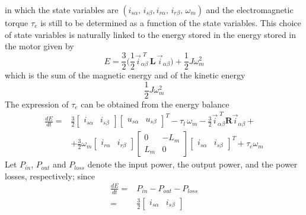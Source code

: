 \documentclass[11pt,a4paper]{scrartcl}
\numberwithin{equation}{section}
\theoremstyle{it}
\theoremstyle{definition}
\begin{document}
\begin{onehalfspace}
in which the state variables are $(i_{s\alpha},\,i_{s\beta}, 
i_{r\alpha},\,i_{r\beta},\,\omega_m)$ and the electromagnetic torque $\tau_e$ 
is still to be determined as a function of the state variables. This choice of 
state variables is naturally linked to the energy stored in the energy stored 
in the motor given by
\begin{equation}\label{im_eq_25}
	E = \frac{3}{2}\Bigg(\frac{1}{2} \vec{i}_{\alpha\beta}^{\,\,T} 
	\,\mathbf{L}\, \vec{i}_{\alpha\beta} \Bigg)+\frac{1}{2}J\omega_m^2
\end{equation}
which is the sum of the magnetic energy and of the kinetic energy
\begin{equation}\label{im_eq_26}
	\frac{1}{2}J\omega_m^2
\end{equation}
The expression of $\tau_e$ can be obtained from the energy balance
\begin{equation}\label{im_eq_27}
	\begin{aligned}
		\frac{dE}{dt} = &
		\frac{3}{2}\left[\begin{matrix}
			i_{s\alpha} & i_{s\beta}
		\end{matrix}\right]
		\left[\begin{matrix}
			u_{s\alpha} & u_{s\beta}
		\end{matrix}\right]^T 
		-\tau_l\,\omega_m-\frac{3}{2}\vec{i}_{\alpha\beta}^{\,\,T}\mathbf{R}\vec{i}_{\alpha\beta}
		+ \\[6pt]
		& + \frac{3}{2}\omega_m
		\left[\begin{matrix}
			i_{r\alpha} & i_{r\beta}
		\end{matrix}\right]
		\left[\begin{matrix}
			0 & -L_m \\
			L_m & 0
		\end{matrix}\right]
		\left[\begin{matrix}
			i_{s\alpha} & i_{s\beta}
		\end{matrix}\right]^T
		+\tau_e\omega_m
	\end{aligned}
\end{equation}
Let $P_{in}$, $P_{out}$ and $P_{loss}$ denote the input power, the output 
power, and the power losses, respectively; since
\begin{equation}\label{im_eq_28}
	\begin{aligned}
		\frac{dE}{dt} = & P_{in} - P_{out} -P_{loss} \\[6pt]
		= &
		\frac{3}{2}\left[\begin{matrix}
			i_{s\alpha} & i_{s\beta}
		\end{matrix}\right]

\end{aligned}
\end{equation}
\end{onehalfspace}
\end{document}
